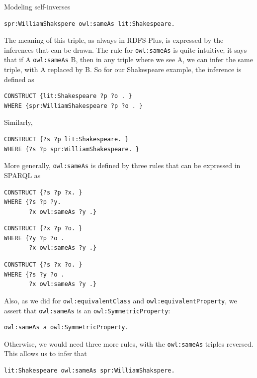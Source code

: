 \begin{challenge}{Modeling self-inverses}
\begin{lstlisting}
spr:WilliamShakspere owl:sameAs lit:Shakespeare.
\end{lstlisting}

The meaning of this triple, as always in RDFS-Plus, is expressed by the
inferences that can be drawn. The rule for \texttt{owl:sameAs} is quite
intuitive; it says that if A \texttt{owl:sameAs} B, then in any triple where we
see A, we can infer the same triple, with A replaced by B. So for our
Shakespeare example, the inference is defined as

\begin{lstlisting}
CONSTRUCT {lit:Shakespeare ?p ?o . }
WHERE {spr:WilliamShakespeare ?p ?o . }
\end{lstlisting}

Similarly,

\begin{lstlisting}
CONSTRUCT {?s ?p lit:Shakespeare. }
WHERE {?s ?p spr:WilliamShakespeare. }
\end{lstlisting}

More generally, \texttt{owl:sameAs} is defined by three rules that can be
expressed in SPARQL as

\begin{lstlisting}
CONSTRUCT {?s ?p ?x. }
WHERE {?s ?p ?y.
       ?x owl:sameAs ?y .}
\end{lstlisting}

\begin{lstlisting}
CONSTRUCT {?x ?p ?o. }
WHERE {?y ?p ?o .
       ?x owl:sameAs ?y .} 
\end{lstlisting}

\begin{lstlisting}
CONSTRUCT {?s ?x ?o. }
WHERE {?s ?y ?o .
       ?x owl:sameAs ?y .}
\end{lstlisting}

Also, as we did for \texttt{owl:equivalentClass} and \texttt{owl:equivalentProperty}, we
assert that \texttt{owl:sameAs} is an \texttt{owl:SymmetricProperty}:

\begin{lstlisting}
owl:sameAs a owl:SymmetricProperty.
\end{lstlisting}

Otherwise, we would need three more rules, with the \texttt{owl:sameAs} triples
reversed. This allows us to infer that

\begin{lstlisting}
lit:Shakespeare owl:sameAs spr:WilliamShakspere.
\end{lstlisting}


\end{challenge}
